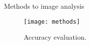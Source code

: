 \begin{frame}[t]{Methods to image analysis} %
    \begin{figure}
        \centering
        \texttt{[image: methods]}
        \caption{Accuracy evaluation. \cite{lin2014microsoft}}
    \end{figure}
\end{frame}

